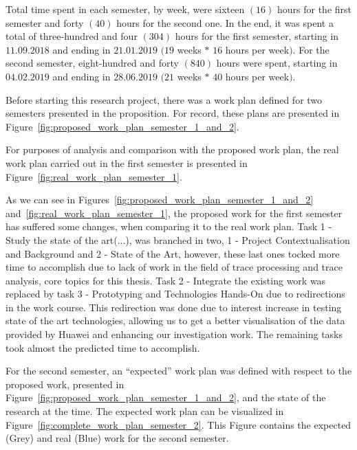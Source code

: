 Total time spent in each semester, by week, were sixteen $(16)$ hours for the first semester and forty $(40)$ hours for the second one. In the end, it was spent a total of three-hundred and four $(304)$ hours for the first semester, starting in $11.09.2018$ and ending in $21.01.2019$ $(19$ weeks $*$ $16$ hours per week$)$. For the second semester, eight-hundred and forty $(840)$ hours were spent, starting in $04.02.2019$ and ending in $28.06.2019$ $(21$ weeks $*$ $40$ hours per week$)$.

Before starting this research project, there was a work plan defined for two semesters presented in the proposition. For record, these plans are presented in Figure~\ref{fig:proposed_work_plan_semester_1_and_2}.

For purposes of analysis and comparison with the proposed work plan, the real work plan carried out in the first semester is presented in Figure~\ref{fig:real_work_plan_semester_1}.

As we can see in Figures~\ref{fig:proposed_work_plan_semester_1_and_2} and~\ref{fig:real_work_plan_semester_1}, the proposed work for the first semester has suffered some changes, when comparing it to the real work plan. Task 1 - Study the state of the art(...), was branched in two, 1 - Project Contextualisation and Background and 2 - State of the Art, however, these last ones tocked more time to accomplish due to lack of work in the field of trace processing and trace analysis, core topics for this thesis. Task 2 - Integrate the existing work was replaced by task 3 - Prototyping and Technologies Hands-On due to redirections in the work course. This redirection was done due to interest increase in testing state of the art technologies, allowing us to get a better visualisation of the data provided by Huawei and enhancing our investigation work. The remaining tasks took almost the predicted time to accomplish.

For the second semester, an ``expected'' work plan was defined with respect to the proposed work, presented in Figure~\ref{fig:proposed_work_plan_semester_1_and_2}, and the state of the research at the time. The expected work plan can be visualized in Figure~\ref{fig:complete_work_plan_semester_2}. This Figure contains the expected (Grey) and real (Blue) work for the second semester.



